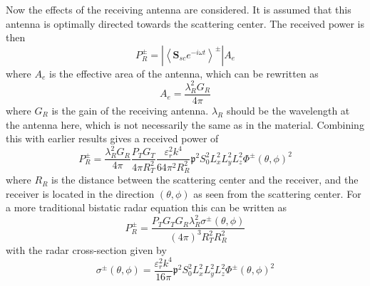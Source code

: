 \documentclass[10pt,a4paper]{eitExjobb}
\begin{document}
	Now the effects of the receiving antenna are considered. It is assumed that this antenna is optimally directed towards the scattering center. The received power is then
	\begin{equation*}
	P_R^\pm = \left| \left< \bm{S}_{sc} e^{-i\omega t} \right>^\pm \right| A_e
	\end{equation*}
	where $A_e$ is the effective area of the antenna, which can be rewritten as
	\begin{equation*}
	A_e = \frac{\lambda_R^2 G_R}{4\pi}
	\end{equation*}
	where $G_R$ is the gain of the receiving antenna. $\lambda_R$ should be the wavelength at the antenna here, which is not necessarily the same as in the material. Combining this with earlier results gives a received power of
	\begin{equation*}
	P_R^\pm = \frac{\lambda_R^2 G_R}{4\pi} \frac{P_T G_T}{4\pi R_T^2} \frac{\varepsilon_r^2 k^4}{64 \pi^2 R_R^2} \mathfrak{p}^2 S_0^2 L_x^2 L_y^2 L_z^2 \Phi^\pm (\theta,\phi)^2
	\end{equation*}
	where $R_R$ is the distance between the scattering center and the receiver, and the receiver is located in the direction $(\theta,\phi)$ as seen from the scattering center. For a more traditional bistatic radar equation this can be written as
	\begin{equation*}
	P_R^\pm = \frac{P_T G_T G_R \lambda_R^2 \sigma^\pm (\theta,\phi)}{(4\pi)^3 R_T^2 R_R^2}
	\end{equation*}
	with the radar cross-section given by
	\begin{equation*}
	\sigma^\pm (\theta, \phi) = \frac{\varepsilon_r^2 k^4}{16\pi} \mathfrak{p}^2 S_0^2 L_x^2 L_y^2 L_z^2 \Phi^\pm (\theta,\phi)^2
	\end{equation*}
	
\end{document}
